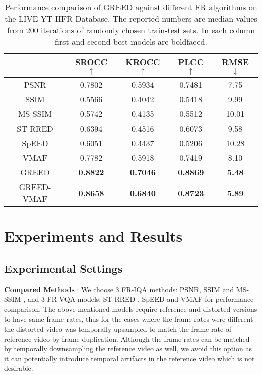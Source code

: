 \documentclass[conference]{IEEEtran}
\begin{document}
\begin{table}[t]
\caption{Performance comparison of GREED against different FR algorithms on the LIVE-YT-HFR Database. The reported numbers are median values from 200 iterations of randomly chosen train-test sets. In each column first and second best models are boldfaced.}
    \label{Table:MOS_comparison}
    \centering
    \begin{tabular}{|c||c|c|c|c|}
        \hline
        ~    & SROCC $\uparrow$ & KROCC $\uparrow$ & PLCC $\uparrow$ & RMSE $\downarrow$ \\ \hline \hline
        PSNR & 0.7802 & 0.5934 & 0.7481 & 7.75 \\ 
        SSIM \cite{wang2004image} & 0.5566 & 0.4042 & 0.5418 & 9.99 \\ 
        MS-SSIM \cite{wang2003multiscale} & 0.5742 & 0.4135 & 0.5512 & 10.01 \\
        ST-RRED \cite{soundararajan2012video} & 0.6394 & 0.4516 & 0.6073 & 9.58 \\ 
        SpEED \cite{bampis2017speed} & 0.6051 & 0.4437 & 0.5206 & 10.28 \\
        VMAF \cite{VMAF2016}& 0.7782 & 0.5918 & 0.7419 & 8.10 \\ \hline
        GREED & \textbf{0.8822} & \textbf{0.7046} & \textbf{0.8869} & \textbf{5.48} \\
        GREED-VMAF & \textbf{0.8658} & \textbf{0.6840} & \textbf{0.8723} & \textbf{5.89} \\
        \hline
    \end{tabular}
\end{table}

\section{Experiments and Results}
\label{sec:experiments}
\subsection{Experimental Settings}
\textbf{Compared Methods} : We choose 3 FR-IQA methods: PSNR, SSIM \cite{wang2004image} and MS-SSIM \cite{wang2003multiscale}, and 3 FR-VQA models: ST-RRED \cite{soundararajan2012video}, SpEED \cite{bampis2017speed} and VMAF \cite{VMAF2016} for performance comparison. The above mentioned models require reference and distorted versions to have same frame rates, thus for the cases where the frame rates were different the distorted video was temporally upsampled to match the frame rate of reference video by frame duplication. Although the frame rates can be matched by temporally downsampling the reference video as well, we avoid this option as it can potentially introduce temporal artifacts in the reference video which is not desirable.
\end{document}
